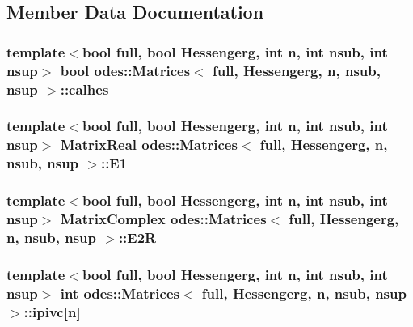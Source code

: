 \subsection{Member Data Documentation}
\hypertarget{classodes_1_1Matrices_a82e935680c27f58bcff8a559700411c6}{
\subsubsection[{calhes}]{\setlength{\rightskip}{0pt plus 5cm}template$<$bool full, bool Hessengerg, int n, int nsub, int nsup$>$ bool {\bf odes\-::\-Matrices}$<$ full, Hessengerg, n, nsub, nsup $>$\-::calhes\hspace{0.3cm}{\ttfamily [protected]}}}\label{classodes_1_1Matrices_a82e935680c27f58bcff8a559700411c6}
\hypertarget{classodes_1_1Matrices_afba5034652d2298f7f8ad01468a1bdbd}{
\subsubsection[{E1}]{\setlength{\rightskip}{0pt plus 5cm}template$<$bool full, bool Hessengerg, int n, int nsub, int nsup$>$ {\bf Matrix\-Real} {\bf odes\-::\-Matrices}$<$ full, Hessengerg, n, nsub, nsup $>$\-::E1\hspace{0.3cm}{\ttfamily [private]}}}\label{classodes_1_1Matrices_afba5034652d2298f7f8ad01468a1bdbd}
\hypertarget{classodes_1_1Matrices_a62ad6fe606146f2957ff8d428da1867d}{
\subsubsection[{E2\-R}]{\setlength{\rightskip}{0pt plus 5cm}template$<$bool full, bool Hessengerg, int n, int nsub, int nsup$>$ {\bf Matrix\-Complex} {\bf odes\-::\-Matrices}$<$ full, Hessengerg, n, nsub, nsup $>$\-::E2\-R\hspace{0.3cm}{\ttfamily [private]}}}\label{classodes_1_1Matrices_a62ad6fe606146f2957ff8d428da1867d}
\hypertarget{classodes_1_1Matrices_a32b17a76a3380307a8fe5e6aa1395e4a}{
\subsubsection[{ipivc}]{\setlength{\rightskip}{0pt plus 5cm}template$<$bool full, bool Hessengerg, int n, int nsub, int nsup$>$ int {\bf odes\-::\-Matrices}$<$ full, Hessengerg, n, nsub, nsup $>$\-::ipivc\mbox{[}n\mbox{]}\hspace{0.3cm}{\ttfamily [private]}}}\label{classodes_1_1Matrices_a32b17a76a3380307a8fe5e6aa1395e4a}
